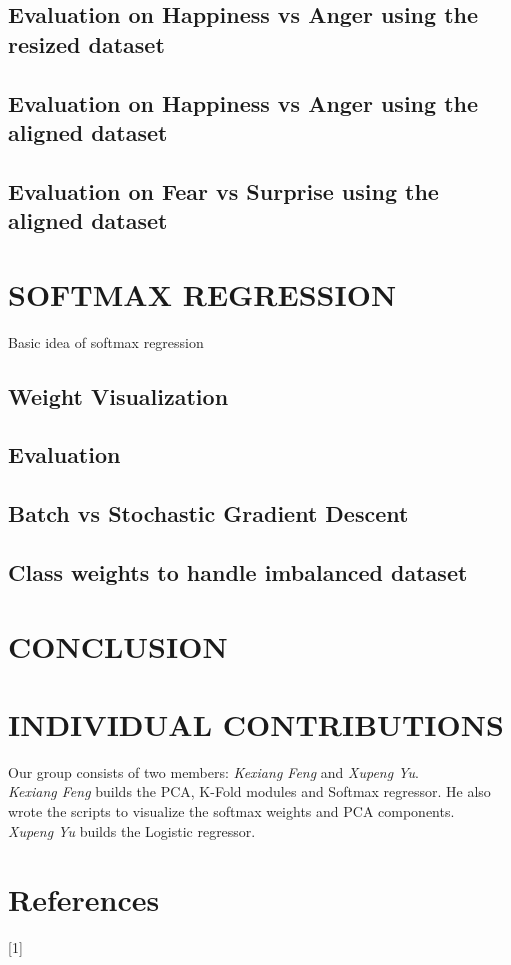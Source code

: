 \documentclass{article} %
\begin{document}
\subsection {Evaluation on Happiness vs Anger using the resized dataset}
\subsection {Evaluation on Happiness vs Anger using the aligned dataset}
\subsection {Evaluation on Fear vs Surprise using the aligned dataset}


\section{SOFTMAX REGRESSION}
Basic idea of softmax regression
\subsection {Weight Visualization}
\subsection {Evaluation}
\subsection {Batch vs Stochastic Gradient Descent}
\subsection {Class weights to handle imbalanced dataset}

\section {CONCLUSION}
\section{INDIVIDUAL CONTRIBUTIONS}
Our group consists of two members: \textit{Kexiang Feng} and \textit{Xupeng Yu}. \\
\textit{Kexiang Feng} builds the PCA, K-Fold modules and Softmax regressor. He also wrote the scripts to visualize the softmax weights and PCA components. \\
\textit{Xupeng Yu} builds the Logistic regressor. 

\section {References}
\small{
[1]
}
\end{document}

